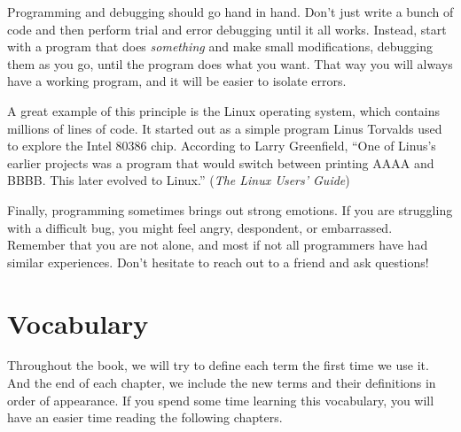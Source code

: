 \documentclass[12pt]{book}
\theoremstyle{exercise}
\begin{document}
Programming and debugging should go hand in hand.
Don't just write a bunch of code and then perform trial and error debugging until it all works.
Instead, start with a program that does {\em something} and make small modifications, debugging them as you go, until the program does what you want.
That way you will always have a working program, and it will be easier to isolate errors.


A great example of this principle is the Linux operating system, which contains millions of lines of code.
It started out as a simple program Linus Torvalds used to explore the Intel 80386 chip.
According to Larry Greenfield, ``One of Linus's earlier projects was a program that would switch between printing AAAA and BBBB.
This later evolved to Linux.'' ({\em The Linux Users' Guide})


Finally, programming sometimes brings out strong emotions.
If you are struggling with a difficult bug, you might feel angry, despondent, or embarrassed.
Remember that you are not alone, and most if not all programmers have had similar experiences.
Don't hesitate to reach out to a friend and ask questions!


\section{Vocabulary}

Throughout the book, we will try to define each term the first time we use it.
And the end of each chapter, we include the new terms and their definitions in order of appearance.
If you spend some time learning this vocabulary, you will have an easier time reading the following chapters.
\end{document}
